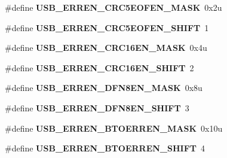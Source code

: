 \begin{DoxyCompactItemize}
\item 
\#define {\bfseries U\+S\+B\+\_\+\+E\+R\+R\+E\+N\+\_\+\+C\+R\+C5\+E\+O\+F\+E\+N\+\_\+\+M\+A\+SK}~0x2u\hypertarget{group__USB__Register__Masks_gafab72bb1aedf0d529c720a25d6ee93da}{}\label{group__USB__Register__Masks_gafab72bb1aedf0d529c720a25d6ee93da}

\item 
\#define {\bfseries U\+S\+B\+\_\+\+E\+R\+R\+E\+N\+\_\+\+C\+R\+C5\+E\+O\+F\+E\+N\+\_\+\+S\+H\+I\+FT}~1\hypertarget{group__USB__Register__Masks_gafc8288624f2373be283f408a290f3daf}{}\label{group__USB__Register__Masks_gafc8288624f2373be283f408a290f3daf}

\item 
\#define {\bfseries U\+S\+B\+\_\+\+E\+R\+R\+E\+N\+\_\+\+C\+R\+C16\+E\+N\+\_\+\+M\+A\+SK}~0x4u\hypertarget{group__USB__Register__Masks_gae216c42729f6b3d992001136744fe341}{}\label{group__USB__Register__Masks_gae216c42729f6b3d992001136744fe341}

\item 
\#define {\bfseries U\+S\+B\+\_\+\+E\+R\+R\+E\+N\+\_\+\+C\+R\+C16\+E\+N\+\_\+\+S\+H\+I\+FT}~2\hypertarget{group__USB__Register__Masks_ga7d910c7016807387969de45f0ac3e2d6}{}\label{group__USB__Register__Masks_ga7d910c7016807387969de45f0ac3e2d6}

\item 
\#define {\bfseries U\+S\+B\+\_\+\+E\+R\+R\+E\+N\+\_\+\+D\+F\+N8\+E\+N\+\_\+\+M\+A\+SK}~0x8u\hypertarget{group__USB__Register__Masks_ga4077d6e25312cdf05ef982907720c2f6}{}\label{group__USB__Register__Masks_ga4077d6e25312cdf05ef982907720c2f6}

\item 
\#define {\bfseries U\+S\+B\+\_\+\+E\+R\+R\+E\+N\+\_\+\+D\+F\+N8\+E\+N\+\_\+\+S\+H\+I\+FT}~3\hypertarget{group__USB__Register__Masks_ga25ff64c64f5871c1c278c5639d862ba7}{}\label{group__USB__Register__Masks_ga25ff64c64f5871c1c278c5639d862ba7}

\item 
\#define {\bfseries U\+S\+B\+\_\+\+E\+R\+R\+E\+N\+\_\+\+B\+T\+O\+E\+R\+R\+E\+N\+\_\+\+M\+A\+SK}~0x10u\hypertarget{group__USB__Register__Masks_ga3e02cf7d8b6fce5077848051a320c609}{}\label{group__USB__Register__Masks_ga3e02cf7d8b6fce5077848051a320c609}

\item 
\#define {\bfseries U\+S\+B\+\_\+\+E\+R\+R\+E\+N\+\_\+\+B\+T\+O\+E\+R\+R\+E\+N\+\_\+\+S\+H\+I\+FT}~4\hypertarget{group__USB__Register__Masks_ga6df540868c71ce6e3c7b8737a048c2aa}{}\label{group__USB__Register__Masks_ga6df540868c71ce6e3c7b8737a048c2aa}


\end{DoxyCompactItemize}
